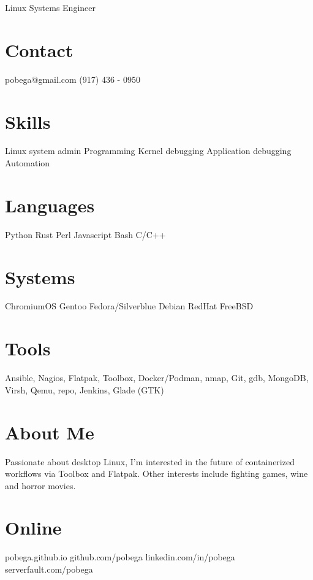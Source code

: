 \documentclass[]{resume}
\begin{document}
\graphicspath{ {images/} }

       {Linux Systems Engineer}


\begin{aside}
  \section{Contact}
    pobega@gmail.com
    (917) 436 - 0950
 \section{Skills}
    Linux system admin
    Programming
    Kernel debugging
    Application debugging
    Automation
  \section{Languages}
    Python
    Rust
    Perl
    Javascript
    Bash
    C/C++
  \section{Systems}
    ChromiumOS
    Gentoo
    Fedora/Silverblue
    Debian
    RedHat
    FreeBSD
  \section{Tools}
    Ansible, Nagios, Flatpak, Toolbox, Docker/Podman, nmap, Git, gdb, MongoDB, Virsh, Qemu, repo, Jenkins, Glade (GTK)
  \section{About Me}
    Passionate about desktop Linux, I'm interested in the future of containerized workflows via
    Toolbox and Flatpak.\break
    Other interests include
    fighting games, wine and horror movies.
  \section{Online}
    {\bodyfontbold pobega}.github.io
    github.com/{\bodyfontbold pobega}
    linkedin.com/in/{\bodyfontbold pobega}
    serverfault.com/{\bodyfontbold pobega}
\end{aside}
\end{document}
